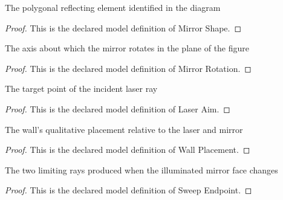 \begin{definition}
  \label{def:physics:phyx-mini-0062:phyxminiproblems-problemphyxmini0062-mirrorshape}
  The polygonal reflecting element identified in the diagram
\end{definition}
\begin{proof}
  This is the declared model definition of Mirror Shape.
\end{proof}
\begin{definition}
  \label{def:physics:phyx-mini-0062:phyxminiproblems-problemphyxmini0062-mirrorrotation}
  The axis about which the mirror rotates in the plane of the figure
\end{definition}
\begin{proof}
  This is the declared model definition of Mirror Rotation.
\end{proof}
\begin{definition}
  \label{def:physics:phyx-mini-0062:phyxminiproblems-problemphyxmini0062-laseraim}
  The target point of the incident laser ray
\end{definition}
\begin{proof}
  This is the declared model definition of Laser Aim.
\end{proof}
\begin{definition}
  \label{def:physics:phyx-mini-0062:phyxminiproblems-problemphyxmini0062-wallplacement}
  The wall's qualitative placement relative to the laser and mirror
\end{definition}
\begin{proof}
  This is the declared model definition of Wall Placement.
\end{proof}
\begin{definition}
  \label{def:physics:phyx-mini-0062:phyxminiproblems-problemphyxmini0062-sweependpoint}
  The two limiting rays produced when the illuminated mirror face changes
\end{definition}
\begin{proof}
  This is the declared model definition of Sweep Endpoint.
\end{proof}
